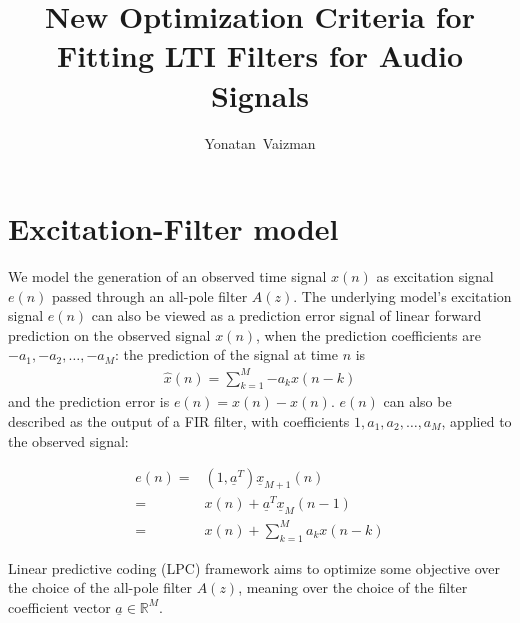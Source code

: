 \documentclass[journal,onecolumn]{IEEEtran}
\newcommand{\field}[1]{\mathbb{#1}}
\begin{document}
%
\title{New Optimization Criteria for Fitting LTI Filters for Audio Signals}
\author{Yonatan~Vaizman}


\maketitle

\section{Excitation-Filter model}
We model the generation of an observed time signal $x(n)$ as excitation signal $e(n)$ passed through an all-pole filter $A(z)$.
The underlying model's excitation signal $e(n)$ can also be viewed as a prediction error signal of linear forward prediction on the observed signal $x(n)$, when the prediction coefficients are $-a_1,-a_2, \ldots, -a_M$: the prediction of the signal at time $n$ is
\begin{align*}
\widehat{x}(n)=\sum\limits_{k=1}^M{-a_k x(n-k)}
\end{align*}
and the prediction error is $e(n) = x(n) - \widehat{x}(n)$. $e(n)$ can also be described as the output of a FIR filter, with coefficients $1,a_1,a_2,\ldots,a_M$, applied to the observed signal:

\begin{align*}
e(n) = & ({1,\underline{a}^T}) \underline{x}_{M+1}(n) \\
     = & x(n) + \underline{a}^T \underline{x}_{M}(n-1) \\
     = & x(n) + \sum\limits_{k=1}^M{a_k x(n-k)}
\end{align*}

Linear predictive coding (LPC) framework aims to optimize some objective over the choice of the all-pole filter $A(z)$, meaning over the choice of the filter coefficient vector $\underline{a}\in \field{R}^M$.
\end{document}
